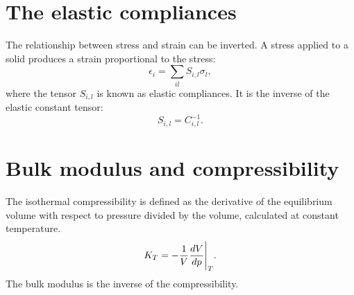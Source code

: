 \documentclass[12pt,a4paper]{article}
\begin{document}
%

\newpage
\section{\color{coral}The elastic compliances}
The relationship between stress and strain can be inverted. A stress 
applied to a solid produces a strain proportional to the stress:
\begin{equation}
\epsilon_{i} =\sum_{il} S_{i,l} \sigma_l, 
\end{equation}
where the tensor $S_{i,l}$ is known as elastic compliances. It is the
inverse of the elastic constant tensor: 
\begin{equation}
S_{i,l} = C_{i,l}^{-1}.
\end{equation}


\newpage
\section{\color{coral}Bulk modulus and compressibility}

The isothermal compressibility is defined as the derivative of the 
equilibrium volume with respect to pressure divided by the volume,
calculated at constant temperature.
\begin{equation}
K_T = - {1 \over V} {d V \over d p}\Bigg|_T.
\end{equation}
The bulk modulus is the inverse of the compressibility. 
\end{document}
